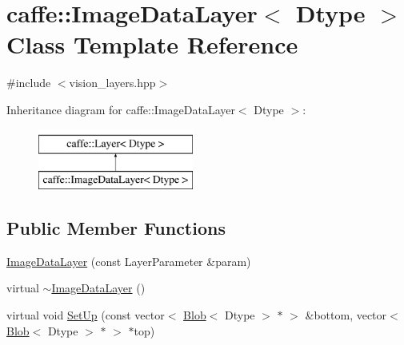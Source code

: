 \hypertarget{classcaffe_1_1_image_data_layer}{\section{caffe\+:\+:Image\+Data\+Layer$<$ Dtype $>$ Class Template Reference}
\label{classcaffe_1_1_image_data_layer}
}


{\ttfamily \#include $<$vision\+\_\+layers.\+hpp$>$}

Inheritance diagram for caffe\+:\+:Image\+Data\+Layer$<$ Dtype $>$\+:\begin{figure}[H]
\begin{center}
\leavevmode
\includegraphics[height=2.000000cm]{classcaffe_1_1_image_data_layer}
\end{center}
\end{figure}
\subsection*{Public Member Functions}
\begin{DoxyCompactItemize}
\item 
\hyperlink{classcaffe_1_1_image_data_layer_a2319914181470f8ecd80ffb63d0daec9}{Image\+Data\+Layer} (const Layer\+Parameter \&param)
\item 
virtual \hyperlink{classcaffe_1_1_image_data_layer_a153c68c5d7da4ffcc1d563c89e0b7336}{$\sim$\+Image\+Data\+Layer} ()
\item 
virtual void \hyperlink{classcaffe_1_1_image_data_layer_a02eedd60b16ef4f2285cd75110a27226}{Set\+Up} (const vector$<$ \hyperlink{classcaffe_1_1_blob}{Blob}$<$ Dtype $>$ $\ast$ $>$ \&bottom, vector$<$ \hyperlink{classcaffe_1_1_blob}{Blob}$<$ Dtype $>$ $\ast$ $>$ $\ast$top)
\end{DoxyCompactItemize}
